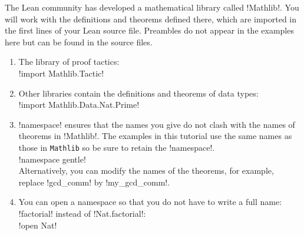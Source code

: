 The Lean community has developed a mathematical library called !Mathlib!. You will work with the definitions and theorems defined there, which are imported in the first lines of your Lean source file. Preambles do not appear in the examples here but can be found in the source files.

\begin{enumerate}
\item The library of proof tactics:\\
\indnt{}!import Mathlib.Tactic!

\item Other libraries contain the definitions and theorems of data types:\\
\indnt{}!import Mathlib.Data.Nat.Prime!

\item !namespace! ensures that the names you give do not clash with the names of theorems in !Mathlib!. The examples in this tutorial use the same names as those in \Verb+Mathlib+ so be sure to retain the !namespace!.\\ \indnt{}!namespace gentle!\\
Alternatively, you can modify the names of the theorems, for example, replace !gcd_comm! by !my_gcd_comm!.\\

\item You can open a namespace so that you do not have to write a full name:  !factorial! instead of !Nat.factorial!:\\
\indnt{}!open Nat!
\end{enumerate}

\newpage

